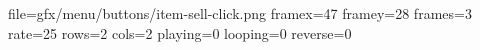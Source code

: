 file=gfx/menu/buttons/item-sell-click.png
framex=47
framey=28
frames=3
rate=25
rows=2
cols=2
playing=0
looping=0
reverse=0